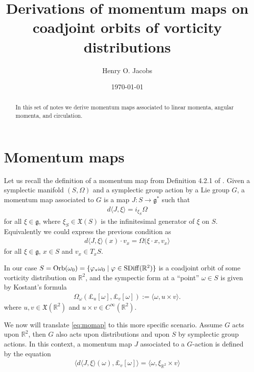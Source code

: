 \documentclass[12pt]{amsart}
\title{Derivations of momentum maps on coadjoint orbits of vorticity distributions}
\author{Henry O. Jacobs}
\date{\today}
\DeclareMathOperator{\SDiff}{SDiff}
\begin{document}
\maketitle

\begin{abstract}
  In this set of notes we derive momentum maps associated to
  linear momenta, angular momenta, and circulation.
\end{abstract}

\section{Momentum maps}
Let us recall the definition of a momentum map from Definition 4.2.1 of \cite{FOM}.
Given a symplectic manifold $(S,\Omega)$ and a symplectic group
action by a Lie group $G$, a momentum map associated to $G$ is a map $J:S \to \mathfrak{g}^*$ such that
\begin{align*}
  d \langle J , \xi \rangle = i_{\xi_S} \Omega
\end{align*}
for all $\xi \in \mathfrak{g}$, where $\xi_S \in \mathfrak{X}(S)$ is the infinitesimal generator of $\xi$ on $S$.
Equivalently we could express the previous condition as
\begin{align}
  d \langle J,\xi \rangle(x) \cdot v_x = \Omega( \xi\cdot x , v_x \rangle \label{eq:momap}
\end{align}
for all $\xi \in \mathfrak{g}$, $x \in S$ and $v_x \in T_xS$.

In our case $S = {\rm Orb}(\omega_0) = \{ \varphi_* \omega_0 \mid \varphi \in \SDiff(\mathbb{R}^2) \}$ is a coadjoint orbit of some vorticity distribution on $\mathbb{R}^2$, and the sympectic form at a ``point'' $\omega \in S$ is given by Kostant's formula
\begin{align*}
  \Omega_\omega( \pounds_u[\omega] , \pounds_v [\omega] ) :=
  \langle \omega , u \times v \rangle.
\end{align*}
where $u,v \in \mathfrak{X}(\mathbb{R}^2)$ and $u \times v \in C^{\infty}(\mathbb{R}^2)$.

We now will translate \eqref{eq:momap} to this more specific scenario.
Assume $G$ acts upon $\mathbb{R}^2$, then $G$ also acts upon distributions and upon $S$ by symplectic group actions.
In this context, a momentum map $J$ associated to a $G$-action is defined by the equation
\begin{align}
  \langle d \langle J , \xi \rangle (\omega) , \pounds_v[\omega] \rangle = \langle \omega , \xi_{\mathbb{R}^2} \times v \rangle \label{eq:momap2}
\end{align}
\end{document}
